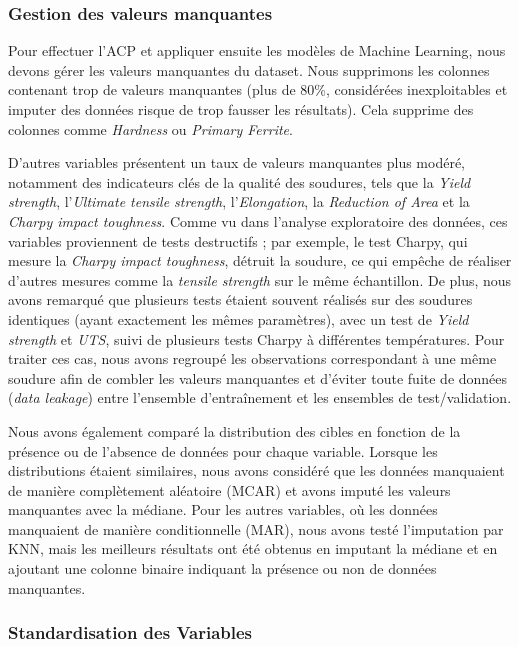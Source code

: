 \documentclass{article}
\begin{document}
\subsubsection{Gestion des valeurs manquantes}

Pour effectuer l'ACP et appliquer ensuite les modèles de Machine Learning, nous devons gérer les valeurs manquantes du dataset.
Nous supprimons les colonnes contenant trop de valeurs manquantes (plus de 80\%, considérées inexploitables et imputer des données risque de trop fausser les résultats). Cela supprime des colonnes comme \textit{Hardness} ou \textit{Primary Ferrite}.

D'autres variables présentent un taux de valeurs manquantes plus modéré, notamment des indicateurs clés de la qualité des soudures, tels que la \textit{Yield strength}, l'\textit{Ultimate tensile strength}, l'\textit{Elongation}, la \textit{Reduction of Area} et la \textit{Charpy impact toughness}. Comme vu dans l'analyse exploratoire des données, ces variables proviennent de tests destructifs ; par exemple, le test Charpy, qui mesure la \textit{Charpy impact toughness}, détruit la soudure, ce qui empêche de réaliser d'autres mesures comme la \textit{tensile strength} sur le même échantillon. De plus, nous avons remarqué que plusieurs tests étaient souvent réalisés sur des soudures identiques (ayant exactement les mêmes paramètres), avec un test de \textit{Yield strength} et \textit{UTS}, suivi de plusieurs tests Charpy à différentes températures. Pour traiter ces cas, nous avons regroupé les observations correspondant à une même soudure afin de combler les valeurs manquantes et d'éviter toute fuite de données (\textit{data leakage}) entre l'ensemble d'entraînement et les ensembles de test/validation.

Nous avons également comparé la distribution des cibles en fonction de la présence ou de l'absence de données pour chaque variable. Lorsque les distributions étaient similaires, nous avons considéré que les données manquaient de manière complètement aléatoire (MCAR) et avons imputé les valeurs manquantes avec la médiane. Pour les autres variables, où les données manquaient de manière conditionnelle (MAR), nous avons testé l'imputation par KNN, mais les meilleurs résultats ont été obtenus en imputant la médiane et en ajoutant une colonne binaire indiquant la présence ou non de données manquantes.

\subsubsection{Standardisation des Variables}
\end{document}
